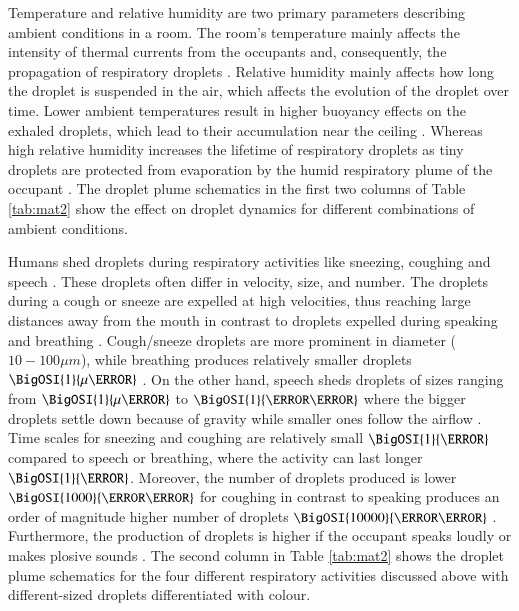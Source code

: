 \documentclass[a4paper,12pt]{elsarticle}
\begin{document}
Temperature and relative humidity are two primary parameters describing ambient conditions in a room. The room's temperature mainly affects the intensity of thermal currents from the occupants and, consequently, the propagation of respiratory droplets \cite{feng2020study}. Relative humidity mainly affects how long the droplet is suspended in the air, which affects the evolution of the droplet over time. Lower ambient temperatures result in higher buoyancy effects on the exhaled droplets, which lead to their accumulation near the ceiling \cite{zhang2019distribution}. Whereas high relative humidity increases the lifetime of respiratory droplets as tiny droplets are protected from evaporation by the humid respiratory plume of the occupant \cite{chong2021extended}. The droplet plume schematics in the first two columns of Table \ref{tab:mat2} show the effect on droplet dynamics for different combinations of ambient conditions.

Humans shed droplets during respiratory activities like sneezing, coughing and speech \cite{stadnytskyi2021breathing}. These droplets often differ in velocity, size, and number. The droplets during a cough or sneeze are expelled at high velocities, thus reaching large distances away from the mouth in contrast to droplets expelled during speaking and breathing \cite{pendar2020numerical,zhang2019distribution}. Cough/sneeze droplets are more prominent in diameter ($ 10-100 \mu m$), while breathing produces relatively smaller droplets $\BigOSI{1}{\mu\meter}$ \cite{shao2021risk}. On the other hand, speech sheds droplets of sizes ranging from $\BigOSI{1}{\mu\meter}$ to $\BigOSI{1}{\milli\meter}$ where the bigger droplets settle down because of gravity while smaller ones follow the airflow \cite{tan2021experimental}. Time scales for sneezing and coughing are relatively small $\BigOSI{1}{\second}$ compared to speech or breathing, where the activity can last longer $\BigOSI{1}{\minute}$. Moreover, the number of droplets produced is lower $\BigOSI{1000}{\per\second}$ for coughing in contrast to speaking produces an order of magnitude higher number of droplets $\BigOSI{10000}{\per\second}$ \cite{giri2022colliding}. Furthermore, the production of droplets is higher if the occupant speaks loudly or makes plosive sounds \cite{abkarian2020speech}. The second column in Table \ref{tab:mat2} shows the droplet plume schematics for the four different respiratory activities discussed above with different-sized droplets differentiated with colour.
\end{document}
